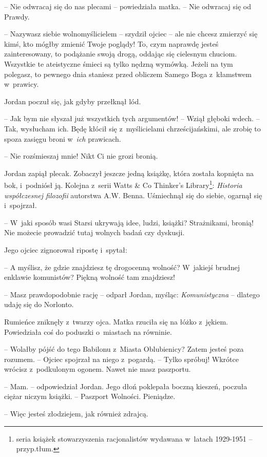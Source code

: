 \documentclass[oneside,polish,11pt,sfheadings]{mwbk}
\begin{document}
-- Nie odwracaj się do nas plecami -- powiedziała matka. -- Nie odwracaj
się od Prawdy.

-- Nazywasz siebie wolnomyślicielem -- szydził ojciec -- ale nie chcesz
zmierzyć się kimś, kto mógłby zmienić Twoje poglądy! To, czym
naprawdę jesteś zainteresowany, to podążanie swoją drogą, oddając się
cielesnym chuciom. Wszystkie te ateistyczne śmieci są tylko nędzną
wymówką. Jeżeli na tym polegasz, to pewnego dnia staniesz przed obliczem
Samego Boga z~kłamstwem w~prawicy.

Jordan poczuł się, jak gdyby przełknął lód.

-- Jak bym nie słyszał już wszystkich tych argumentów! -- Wziął głęboki
wdech. -- Tak, wysłucham ich. Będę kłócił się z~myślicielami
chrześcijańskimi, ale zrobię to spoza zasięgu broni w~\emph{ich}
prawicach.

-- Nie rozśmieszaj mnie! Nikt Ci nie grozi bronią.

Jordan zapiął plecak. Zobaczył jeszcze jedną książkę, która została
kopnięta na bok, i~podniósł ją. Kolejna z~serii Watts \& Co Thinker's
Library\footnote{seria książek stowarzyszenia racjonalistów wydawana w~latach
1929-1951 -- przyp.tłum.}: \emph{Historia współczesnej filozofii }autorstwa A.W. Benna. Uśmiechnął się do siebie, ogarnął się i~spojrzał.

-- W~jaki sposób wasi Starsi ukrywają idee, ludzi, książki? Strażnikami,
bronią! Nie możecie prowadzić tutaj wolnych badań czy dyskusji.

Jego ojciec zignorował ripostę i~spytał: 

-- A myślisz, że gdzie
znajdziesz tę drogocenną wolność? W~jakiejś brudnej enklawie komunistów?
Piękną wolność tam znajdziesz!

-- Masz prawdopodobnie rację -- odparł Jordan, myśląc:
\emph{Komunistyczna} -- dlatego udaję się do Norlonto.

Rumieńce zniknęły z~twarzy ojca. Matka rzuciła się na łóżko z~jękiem.
Powiedziała coś do poduszki o~miastach na równinie.

-- Wolałby pójść do tego Babilonu z~Miasta Oblubienicy? Zatem jesteś poza
rozumem. -- Ojciec spojrzał na niego z~pogardą. -- Tylko spróbuj! Wkrótce
wrócisz z~podkulonym ogonem. Nawet nie masz paszportu.

-- Mam. -- odpowiedział Jordan. Jego dłoń poklepała boczną kieszeń,
poczuła ciężar niczym książki. -- Paszport Wolności. Pieniądze.

-- Więc jesteś złodziejem, jak również zdrajcą.
\end{document}
